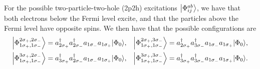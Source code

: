 For the possible two-particle-two-hole (2p2h) excitations $\ket*{\Phi_{ij}^{ab}}$, we have that both electrons below the Fermi level excite, and that the particles above the Fermi level have opposite spins.
We then have that the possible configurations are
\begin{align*}
    \ket*{\Phi_{1\sigma_{+}, 1\sigma_{-}}^{2\sigma_{+}, 2\sigma_{-}}}
    &= a_{2\sigma_{+}}^\dagger a_{2\sigma_{-}}^\dagger a_{1\sigma_{-}} a_{1\sigma_{+}} \ket*{\Phi_0}, &
    \ket*{\Phi_{1\sigma_{+}, 1\sigma_{-}}^{2\sigma_{+}, 3\sigma_{-}}}
    &= a_{2\sigma_{+}}^\dagger a_{3\sigma_{-}}^\dagger a_{1\sigma_{-}} a_{1\sigma_{+}} \ket*{\Phi_0}, \\
    \ket*{\Phi_{1\sigma_{+}, 1\sigma_{-}}^{3\sigma_{+}, 2\sigma_{-}}}
    &= a_{3\sigma_{+}}^\dagger a_{2\sigma_{-}}^\dagger a_{1\sigma_{-}} a_{1\sigma_{+}} \ket*{\Phi_0}, &
    \ket*{\Phi_{1\sigma_{+}, 1\sigma_{-}}^{3\sigma_{+}, 3\sigma_{-}}}
    &= a_{3\sigma_{+}}^\dagger a_{3\sigma_{-}}^\dagger a_{1\sigma_{-}} a_{1\sigma_{+}} \ket*{\Phi_0}.
\end{align*}

